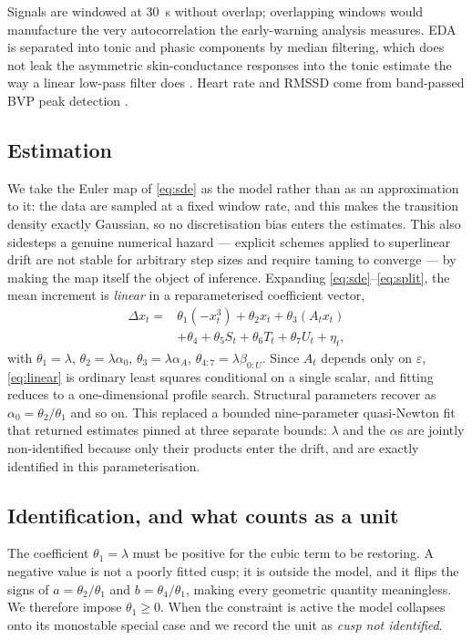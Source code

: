 \documentclass[conference]{IEEEtran}
\begin{document}
Signals are windowed at \SI{30}{\second} without overlap; overlapping windows
would manufacture the very autocorrelation the early-warning analysis measures.
EDA is separated into tonic and phasic components by median filtering, which
does not leak the asymmetric skin-conductance responses into the tonic estimate
the way a linear low-pass filter does \cite{benedek2010}. Heart rate and RMSSD
come from band-passed BVP peak detection \cite{shaffer2017}.

\subsection{Estimation}
\label{sec:estimation}
We take the Euler map of \eqref{eq:sde} as the model rather than as an
approximation to it: the data are sampled at a fixed window rate, and this
makes the transition density exactly Gaussian, so no discretisation bias enters
the estimates. This also sidesteps a genuine numerical hazard --- explicit
schemes applied to superlinear drift are not stable for arbitrary step sizes
and require taming to converge \cite{hutzenthaler2012} --- by making the map
itself the object of inference. Expanding \eqref{eq:sde}--\eqref{eq:split}, the mean increment
is \emph{linear} in a reparameterised coefficient vector,
\begin{equation}
\begin{split}
\Delta x_t = {}& \theta_1(-x_t^3)+\theta_2 x_t+\theta_3(A_tx_t)\\
& +\theta_4+\theta_5S_t+\theta_6T_t+\theta_7U_t+\eta_t,
\end{split}
\label{eq:linear}
\end{equation}
with $\theta_1=\lambda$, $\theta_2=\lambda\alpha_0$,
$\theta_3=\lambda\alpha_A$, $\theta_{4:7}=\lambda\beta_{0:U}$. Since $A_t$
depends only on $\varepsilon$, \eqref{eq:linear} is ordinary least squares
conditional on a single scalar, and fitting reduces to a one-dimensional
profile search. Structural parameters recover as $\alpha_0=\theta_2/\theta_1$
and so on. This replaced a bounded nine-parameter quasi-Newton fit that
returned estimates pinned at three separate bounds: $\lambda$ and the $\alpha$s
are jointly non-identified because only their products enter the drift, and are
exactly identified in this parameterisation.

\subsection{Identification, and what counts as a unit}
\label{sec:identification}
The coefficient $\theta_1=\lambda$ must be positive for the cubic term to be
restoring. A negative value is not a poorly fitted cusp; it is outside the
model, and it flips the signs of $a=\theta_2/\theta_1$ and
$b=\theta_4/\theta_1$, making every geometric quantity meaningless. We
therefore impose $\theta_1\ge0$. When the constraint is active the model
collapses onto its monostable special case and we record the unit as
\emph{cusp not identified}.
\end{document}
